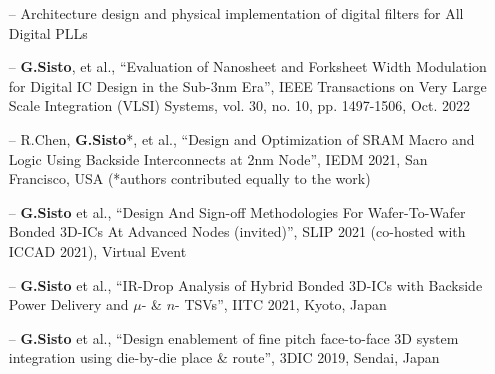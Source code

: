 \documentclass[10pt,a4paper,fancychapters]{altacv}
\begin{document}


\begin{itemize}
    \setlength{\itemindent}{0.5em}
    \item[--]  \small {Architecture design and physical implementation of digital filters for All Digital PLLs}
    
\end{itemize}



\begin{fullwidth}
\begin{itemize}
    \setlength{\itemindent}{0.5em}
    \item[--] \small{\textbf{G.Sisto},  et al., ``Evaluation of Nanosheet and Forksheet Width Modulation for Digital IC
    Design in the Sub-3nm Era'', IEEE Transactions on Very Large Scale Integration (VLSI) Systems, vol. 30, no. 10, pp.
    1497-1506, Oct. 2022} 
    \item[--] \small{R.Chen, \textbf{G.Sisto}*,  et al., ``Design and Optimization of SRAM Macro and Logic Using Backside
    Interconnects at 2nm Node'', IEDM 2021, San Francisco, USA (*authors contributed equally to the work)} 
    \item[--] \small{\textbf{G.Sisto}  et al., ``Design And Sign-off Methodologies For
    Wafer-To-Wafer Bonded 3D-ICs At Advanced Nodes (invited)'', SLIP 2021 (co-hosted with ICCAD 2021), Virtual Event}
    \item[--] \small{\textbf{G.Sisto} et al., ``IR-Drop Analysis of Hybrid Bonded 3D-ICs with Backside Power Delivery and $\mu$- \& $n$- TSVs'', IITC 2021, Kyoto, Japan} 
    \item[--] \small{\textbf{G.Sisto} et al., ``Design enablement of fine pitch face-to-face 3D system integration using die-by-die place \& route'', 3DIC 2019, Sendai, Japan}
\end{itemize}
\end{fullwidth}
\end{document}
